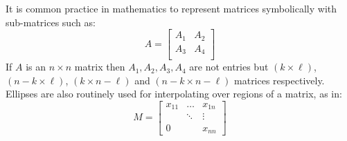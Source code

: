 It is common practice in mathematics to represent matrices symbolically with sub-matrices such as:
\begin{equation}
	A = \left[
		\begin{array}{ccc}
			A_1 & A_2 \\
			A_3 & A_4 \\
		\end{array}
	\right]
\end{equation}
If $A$ is an $n \times n$ matrix then $A_1, A_2, A_3, A_4$ are not entries but $(k \times \ell)$, $(n-k \times \ell)$, $(k \times n - \ell)$ and $(n-k \times n - \ell)$ matrices respectively.
Ellipses are also routinely used for interpolating over regions of a matrix, as in:
\begin{equation}
	M = \left[
		\begin{array}{ccc}
			x_{11} & \ldots & x_{1n} \\
			& \ddots & \vdots \\
			0 & & x_{nn}
		\end{array}
	\right]
\end{equation}





























